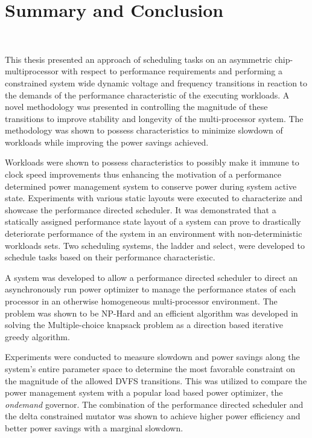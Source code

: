\chapter{Summary and Conclusion}~\label{chap:conclusion}

This thesis presented an approach of scheduling tasks on an asymmetric chip-multiprocessor
with respect to performance requirements and performing a constrained system wide
dynamic voltage and frequency transitions in reaction to the demands of the
performance characteristic of the executing workloads. A novel methodology was
presented in controlling the magnitude of these transitions to improve stability
and longevity of the multi-processor system. The methodology was shown to possess 
characteristics to minimize slowdown of workloads while improving the power savings achieved. 

Workloads were shown to possess characteristics to possibly make it immune to clock 
speed improvements thus enhancing the motivation of a performance determined power
management system to conserve power during system active state. Experiments with various 
static layouts were executed to characterize and showcase 
the performance directed scheduler. It was demonstrated that a statically assigned
performance state layout of a system can prove to drastically deteriorate performance 
of the system in an environment with non-deterministic workloads sets. 
Two scheduling systems, the ladder and select, were developed to schedule tasks based on
their performance characteristic.

A system was developed to allow a performance directed scheduler to direct an asynchronously
run power optimizer to manage the performance states of each processor in an otherwise 
homogeneous multi-processor environment. The problem was shown to be NP-Hard and an 
efficient algorithm was developed in solving the Multiple-choice knapsack problem 
as a direction based iterative greedy algorithm.

Experiments were conducted to measure slowdown and power savings along the system's entire
parameter space to determine the most favorable constraint on the magnitude of the 
allowed DVFS transitions. This was utilized to compare the power management system
with a popular load based power optimizer, the \textit{ondemand} governor.
The combination of the performance directed scheduler and the delta constrained mutator
was shown to achieve higher power efficiency and better power savings with a marginal 
slowdown.
